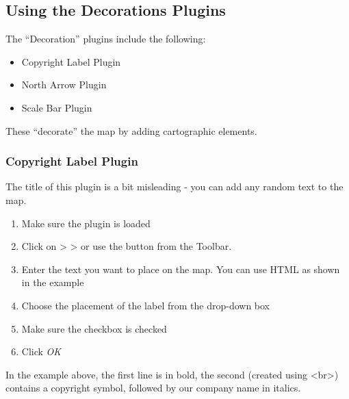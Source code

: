 \subsection{Using the Decorations Plugins}

The ``Decoration'' plugins include the following:

\begin{itemize}
\item Copyright Label Plugin
\item North Arrow Plugin
\item Scale Bar Plugin
\end{itemize}
 
These ``decorate'' the map by adding cartographic elements. 

\subsubsection{Copyright Label Plugin}


The title of this plugin is a bit misleading - you can add any random text to the map.

\begin{enumerate}
\item Make sure the plugin is loaded
\item Click on  >  >  or use the  button from the Toolbar.
\item Enter the text you want to place on the map. You can use HTML as
  shown in the example
\item Choose the placement of the label from the  drop-down box
\item Make sure the  checkbox is checked
\item Click \textsl{OK} 
\end{enumerate}

In the example above, the first line is in bold, the second (created using
\textless br\textgreater) contains a copyright symbol, followed by our company name in
italics.

